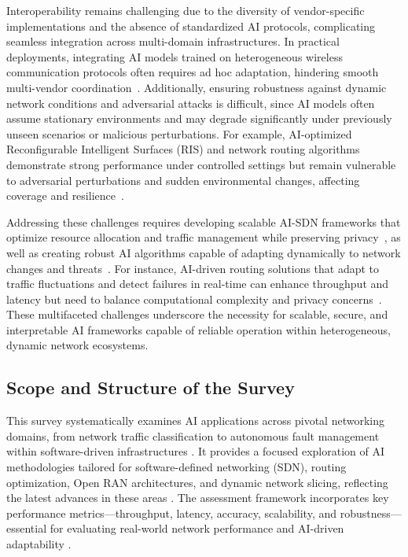 \documentclass[sigconf]{acmart}
\begin{document}
Interoperability remains challenging due to the diversity of vendor-specific implementations and the absence of standardized AI protocols, complicating seamless integration across multi-domain infrastructures. In practical deployments, integrating AI models trained on heterogeneous wireless communication protocols often requires ad hoc adaptation, hindering smooth multi-vendor coordination~\cite{ref30,ref48}. Additionally, ensuring robustness against dynamic network conditions and adversarial attacks is difficult, since AI models often assume stationary environments and may degrade significantly under previously unseen scenarios or malicious perturbations. For example, AI-optimized Reconfigurable Intelligent Surfaces (RIS) and network routing algorithms demonstrate strong performance under controlled settings but remain vulnerable to adversarial perturbations and sudden environmental changes, affecting coverage and resilience~\cite{ref49,ref50,ref53}.

Addressing these challenges requires developing scalable AI-SDN frameworks that optimize resource allocation and traffic management while preserving privacy~\cite{ref52}, as well as creating robust AI algorithms capable of adapting dynamically to network changes and threats~\cite{ref49,ref50,ref53}. For instance, AI-driven routing solutions that adapt to traffic fluctuations and detect failures in real-time can enhance throughput and latency but need to balance computational complexity and privacy concerns~\cite{ref53}. These multifaceted challenges underscore the necessity for scalable, secure, and interpretable AI frameworks capable of reliable operation within heterogeneous, dynamic network ecosystems.

\subsection{Scope and Structure of the Survey}

This survey systematically examines AI applications across pivotal networking domains, from network traffic classification to autonomous fault management within software-driven infrastructures \cite{ref31,ref32}. It provides a focused exploration of AI methodologies tailored for software-defined networking (SDN), routing optimization, Open RAN architectures, and dynamic network slicing, reflecting the latest advances in these areas \cite{ref33,ref34,ref35}. The assessment framework incorporates key performance metrics—throughput, latency, accuracy, scalability, and robustness—essential for evaluating real-world network performance and AI-driven adaptability \cite{ref51,ref52}.
\end{document}
